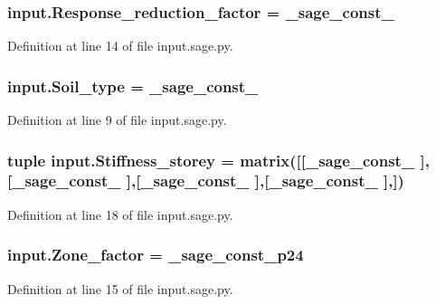 \hypertarget{namespaceinput_aa6d0078a6d934c0d515d85059525e938}{}
\subsubsection[{Response\+\_\+reduction\+\_\+factor}]{\setlength{\rightskip}{0pt plus 5cm}input.\+Response\+\_\+reduction\+\_\+factor = \+\_\+sage\+\_\+const\+\_}\label{namespaceinput_aa6d0078a6d934c0d515d85059525e938}


Definition at line 14 of file input.\+sage.\+py.

\hypertarget{namespaceinput_a6221ae01cf2fb9e8cd22204749785a0e}{}
\subsubsection[{Soil\+\_\+type}]{\setlength{\rightskip}{0pt plus 5cm}input.\+Soil\+\_\+type = \+\_\+sage\+\_\+const\+\_}\label{namespaceinput_a6221ae01cf2fb9e8cd22204749785a0e}


Definition at line 9 of file input.\+sage.\+py.

\hypertarget{namespaceinput_a3853184afbe677b2a218690766c4f5e4}{}
\subsubsection[{Stiffness\+\_\+storey}]{\setlength{\rightskip}{0pt plus 5cm}tuple input.\+Stiffness\+\_\+storey = matrix(\mbox{[}\mbox{[}\+\_\+sage\+\_\+const\+\_ \mbox{]},\mbox{[}\+\_\+sage\+\_\+const\+\_ \mbox{]},\mbox{[}\+\_\+sage\+\_\+const\+\_ \mbox{]},\mbox{[}\+\_\+sage\+\_\+const\+\_ \mbox{]},\mbox{]})}\label{namespaceinput_a3853184afbe677b2a218690766c4f5e4}


Definition at line 18 of file input.\+sage.\+py.

\hypertarget{namespaceinput_aeea70e58ec9bb0d3d6c4363867eb0f82}{}
\subsubsection[{Zone\+\_\+factor}]{\setlength{\rightskip}{0pt plus 5cm}input.\+Zone\+\_\+factor = \+\_\+sage\+\_\+const\+\_\+p24}\label{namespaceinput_aeea70e58ec9bb0d3d6c4363867eb0f82}


Definition at line 15 of file input.\+sage.\+py.


